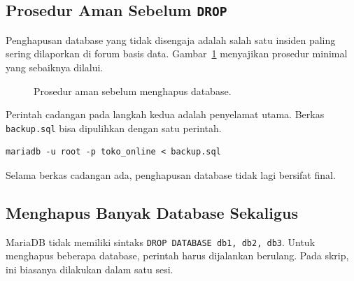 \documentclass[11pt,a4paper]{article}
\begin{document}
\subsection{Prosedur Aman Sebelum \texttt{DROP}}

Penghapusan database yang tidak disengaja adalah salah satu insiden paling sering dilaporkan di forum basis data. Gambar~\ref{fig:drop-safe} menyajikan prosedur minimal yang sebaiknya dilalui.

\begin{figure}[H]
	\centering
	\caption{Prosedur aman sebelum menghapus database.}
	\label{fig:drop-safe}
\end{figure}

Perintah cadangan pada langkah kedua adalah penyelamat utama. Berkas \texttt{backup.sql} bisa dipulihkan dengan satu perintah.

\begin{lstlisting}[style=code]
mariadb -u root -p toko_online < backup.sql
\end{lstlisting}

Selama berkas cadangan ada, penghapusan database tidak lagi bersifat final.

\subsection{Menghapus Banyak Database Sekaligus}

MariaDB tidak memiliki sintaks \texttt{DROP DATABASE db1, db2, db3}. Untuk menghapus beberapa database, perintah harus dijalankan berulang. Pada skrip, ini biasanya dilakukan dalam satu sesi.
\end{document}
